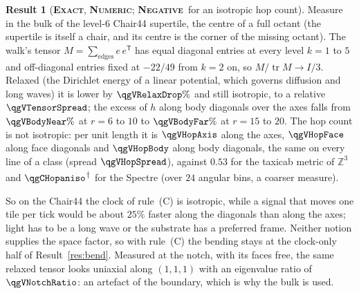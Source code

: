 \documentclass[11pt]{article}
\newcommand{\exact}{\textbf{\textsc{Exact}}}
\newcommand{\numeric}{\textbf{\textsc{Numeric}}}
\newcommand{\negres}{\textbf{\textsc{Negative}}}
\newcommand{\snap}{\textsuperscript{$\dagger$}}      %
\theoremstyle{definition}
\newtheorem{result}{Result}
\begin{document}
\begin{result}[\exact, \numeric; \negres\ for an isotropic hop count]\label{res:chairmetric}
Measure in the bulk of the level-$6$ Chair44 supertile, the centre of a full octant (the supertile is itself a chair, and its centre is the corner of the missing octant). The walk's tensor $M=\sum_{\text{edges}}e\,e^{\mathsf T}$ has equal diagonal entries at every level $k=1$ to $5$ and off-diagonal entries fixed at $-22/49$ from $k=2$ on, so $M/\operatorname{tr}M\to I/3$. Relaxed (the Dirichlet energy of a linear potential, which governs diffusion and long waves) it is lower by $\qgVRelaxDrop\%$ and still isotropic, to a relative $\qgVTensorSpread$; the excess of $h$ along body diagonals over the axes falls from $\qgVBodyNear\%$ at $r=6$ to $10$ to $\qgVBodyFar\%$ at $r=15$ to $20$. The hop count is not isotropic: per unit length it is $\qgVHopAxis$ along the axes, $\qgVHopFace$ along face diagonals and $\qgVHopBody$ along body diagonals, the same on every line of a class (spread $\qgVHopSpread$), against $0.53$ for the taxicab metric of $\mathbb{Z}^3$ and $\qgCHopaniso$\snap\ for the Spectre (over $24$ angular bins, a coarser measure).
\end{result}
So on the Chair44 the clock of rule~(C) is isotropic, while a signal that moves one tile per tick would be about $25\%$ faster along the diagonals than along the axes; light has to be a long wave or the substrate has a preferred frame. Neither notion supplies the space factor, so with rule~(C) the bending stays at the clock-only half of Result~\ref{res:bend}. Measured at the notch, with its faces free, the same relaxed tensor looks uniaxial along $(1,1,1)$ with an eigenvalue ratio of $\qgVNotchRatio$: an artefact of the boundary, which is why the bulk is used.
\end{document}
